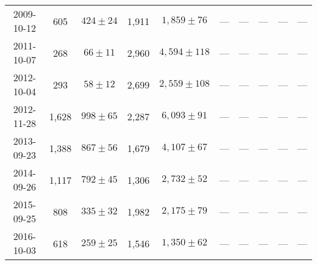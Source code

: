 \begin{landscape}
\begin{longtable}{cccccccccc}
{2009-10-12} & 605 & {$424  \pm  24$} & 1,911 & {$1,859 \pm 76$} & --- & --- & --- & --- & --- \\
{2011-10-07} & 268 & {$66  \pm  11$} & 2,960 & {$4,594 \pm 118$} & --- & --- & --- & --- & --- \\
{2012-10-04} & 293 & {$58  \pm  12$} & 2,699 & {$2,559 \pm 108$} & --- & --- & --- & --- & --- \\
{2012-11-28} & 1,628 & {$998  \pm  65$} & 2,287 & {$6,093 \pm 91$} & --- & --- & --- & --- & --- \\
{2013-09-23} & 1,388 & {$867  \pm  56$} & 1,679 & {$4,107 \pm 67$} & --- & --- & --- & --- & --- \\
{2014-09-26} & 1,117 & {$792  \pm  45$} & 1,306 & {$2,732 \pm 52$} & --- & --- & --- & --- & --- \\
{2015-09-25} & 808 & {$335  \pm  32$} & 1,982 & {$2,175 \pm 79$} & --- & --- & --- & --- & --- \\
{2016-10-03} & 618 & {$259  \pm  25$} & 1,546 & {$1,350 \pm 62$} & --- & --- & --- & --- & --- \\
\end{longtable} 
\end{landscape} 
